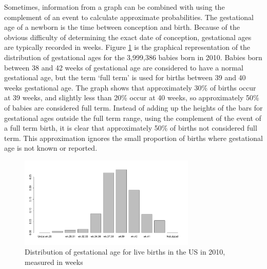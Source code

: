 

Sometimes, information from a graph can be combined with using the complement of an event to calculate approximate probabilities. The gestational age of a newborn is the time between conception and birth. Because of the obvious difficulty of determining the exact date of conception, gestational ages are typically recorded in weeks. Figure \ref{fig:gestageMarginalDist} is the graphical representation of the distribution of gestational ages for the  3,999,386 babies born in 2010.  Babies born between 38 and 42 weeks of gestational age are considered to have a normal gestational age, but the term `full term' is used for births between 39 and 40 weeks gestational age.  The graph shows that approximately 30\% of births occur at 39 weeks, and slightly less than 20\% occur at 40 weeks, so approximately 50\% of babies are considered full term.  Instead of adding up the heights of the bars for gestational ages outside the full term range, using the complement of the event of a full term birth, it is clear that approximately 50\% of births not considered full term.  This approximation ignores the small proportion of births where gestational age is not known or reported.

\begin{figure}
  \begin{center}
\includegraphics[width=0.75\textwidth]{ch_probability_oi_biostat/figures/gestageMarginalDist/gestageMarginalDist.pdf}
  \caption{Distribution of gestational age for live births in the US in 2010, measured in weeks}
  \label{fig:gestageMarginalDist}
  \end{center}
  \end{figure}


